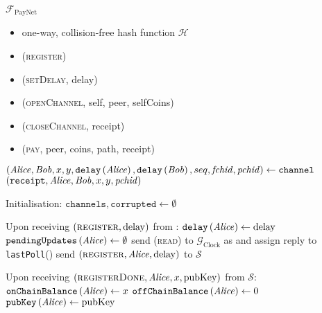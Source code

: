 \begin{functionality}{$\mathcal{F}_{\mathrm{PayNet}}$}
  \label{alg:payfunc}
    \begin{itemize}
      \item one-way, collision-free hash function $\mathcal{H}$
    \end{itemize}

    \begin{itemize}
      \item (\textsc{register})
      \item (\textsc{setDelay}, delay)
      \item (\textsc{openChannel}, self, peer, selfCoins)
      \item (\textsc{closeChannel}, receipt)
      \item (\textsc{pay}, peer, coins, path, receipt)
    \end{itemize}

  \begin{algorithmic}[1]
      \State $\left(\mathit{Alice}, \mathit{Bob}, x, y, \mathtt{delay}\left(\mathit{Alice}\right),
      \mathtt{delay}\left(\mathit{Bob}\right), seq, \mathit{fchid},
      \mathit{pchid}\right) \gets \mathtt{channel}$
      \State \Return $\left(\mathtt{receipt}, \mathit{Alice}, \mathit{Bob}, x, y,
      \mathit{pchid}\right)$
    \EndFunction
    \State

    \State Initialisation:
    \Indent
      \State $\mathtt{channels}, \mathtt{corrupted} \gets \emptyset$
    \EndIndent
    \State

    \State Upon receiving $\left(\textsc{register}, \mathrm{delay}\right)$ from
    \alice:
    \Indent
      \State $\mathtt{delay}\left(\mathit{Alice}\right) \gets \mathrm{delay}$
      \State $\mathtt{pendingUpdates}\left(\mathit{Alice}\right) \gets \emptyset$
      \State send (\textsc{read}) to $\mathcal{G}_{\mathrm{Clock}}$ as
      \alice and assign reply to \texttt{lastPoll}(\alice)
      \State send $\left(\textsc{register}, \mathit{Alice}, \mathrm{delay}\right)$ to
      $\mathcal{S}$
    \EndIndent
    \State

    \State Upon receiving $\left(\textsc{registerDone}, \mathit{Alice}, x,
    \mathrm{pubKey}\right)$ from $\mathcal{S}$: 
    \Indent
      \State $\mathtt{onChainBalance}\left(\mathit{Alice}\right) \gets x$
      \State $\mathtt{offChainBalance}\left(\mathit{Alice}\right) \gets 0$
      \State $\mathtt{pubKey}\left(\mathit{Alice}\right) \gets \mathrm{pubKey}$
    \EndIndent
    \State


\end{algorithmic}
\end{functionality}
